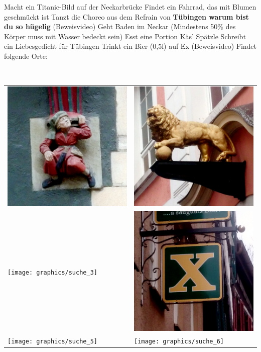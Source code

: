 \documentclass[11pt,paper=a4,answers]{exam}
\renewenvironment{questions}{
	\begin{q}
		\pointsinrightmargin
		\marginpointname{\ Pkt}
		\bracketedpoints }{
	\end{q}}
\begin{document}
	\begin{questions}
		\question[5] Macht ein Titanic-Bild auf der Neckarbrücke
		\question[5] Findet ein Fahrrad, das mit Blumen geschmückt ist
		\question[20] Tanzt die Choreo aus dem Refrain von \textbf{Tübingen warum bist du so hügelig} (Beweisvideo)
		\question[50] Geht Baden im Neckar (Mindestens 50\% des Körper muss mit Wasser bedeckt sein)
		\question[5] Esst eine Portion Käs' Spätzle
		\question[10] Schreibt ein Liebesgedicht für Tübingen
		\question[5] Trinkt ein Bier (0,5l) auf Ex (Beweisvideo)
		\marginpointname{}
		 Findet folgende Orte:
		
	\end{questions}
\ \\
\noindent
\begin{tabularx}{19cm}{XX}
	\includegraphics[width=7.5cm]{graphics/suche_1} & \includegraphics[width=7.5cm]{graphics/suche_2} \\ \texttt{[image: graphics/suche\_3]} & \includegraphics[width=7.5cm]{graphics/suche_4} \\ \texttt{[image: graphics/suche\_5]} & \texttt{[image: graphics/suche\_6]}
\end{tabularx}
\end{document}

